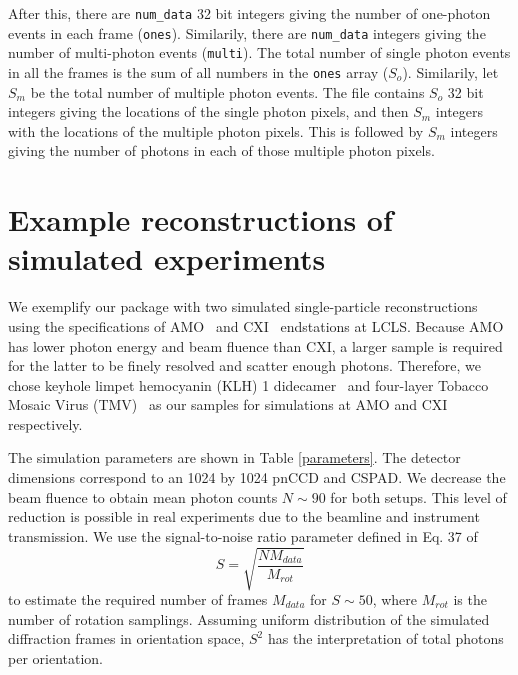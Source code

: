 \documentclass[]{iucr}              %
\begin{document}
After this, there are \texttt{num\_data} 32 bit integers giving the number of one-photon events in each frame (\texttt{ones}). Similarily, there are \texttt{num\_data} integers giving the number of multi-photon events (\texttt{multi}). The total number of single photon events in all the frames is the sum of all numbers in the \texttt{ones} array ($S_o$). Similarily, let $S_m$ be the total number of multiple photon events. The file contains $S_o$ 32 bit integers giving the locations of the single photon pixels, and then $S_m$ integers with the locations of the multiple photon pixels. This is followed by $S_m$ integers giving the number of photons in each of those multiple photon pixels. 

\section{Example reconstructions of simulated experiments}

We exemplify our package with two simulated single-particle reconstructions using the specifications of AMO~\cite{ferguson2015} and CXI~\cite{liang2015} endstations at LCLS. Because AMO has lower photon energy and beam fluence than CXI, a larger sample is required for the latter to be finely resolved and scatter enough photons. Therefore, we chose keyhole limpet hemocyanin (KLH) 1 didecamer~\cite{gatsogiannis2009} and four-layer Tobacco Mosaic Virus (TMV)~\cite{bhyravbhatla1998} as our samples for simulations at AMO and CXI respectively.

The simulation parameters are shown in Table \ref{parameters}. The detector dimensions correspond to an 1024 by 1024 pnCCD and CSPAD. We decrease the beam fluence to obtain mean photon counts $N\sim 90$ for both setups. This level of reduction is possible in real experiments due to the beamline and instrument transmission. We use the signal-to-noise ratio parameter defined in Eq. 37 of 
\begin{equation}
S = \sqrt{\frac{N M_{data}}{M_{rot}}}
\end{equation}
to estimate the required number of frames $M_{data}$ for $S\sim50$, where $M_{rot}$ is the number of rotation samplings. Assuming uniform distribution of the simulated diffraction frames in orientation space, $S^2$ has the interpretation of total photons per orientation.
\end{document}
